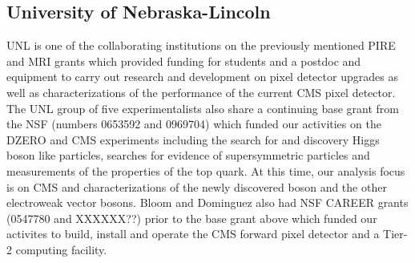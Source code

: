 \subsection{University of Nebraska-Lincoln} 

UNL is one of the collaborating institutions on the previously
mentioned PIRE and MRI grants which provided funding for students and
a postdoc and equipment to carry out research and development on pixel
detector upgrades as well as characterizations of the performance of
the current CMS pixel detector.  The UNL group of five
experimentalists also share a continuing base grant from the NSF
(numbers 0653592 and 0969704) which funded our activities on the DZERO
and CMS experiments including the search for and discovery Higgs boson
like particles, searches for evidence of supersymmetric particles and
measurements of the properties of the top quark.  At this time, our
analysis focus is on CMS and characterizations of the newly discovered
boson and the other electroweak vector bosons.  Bloom and Dominguez
also had NSF CAREER grants (0547780 and XXXXXX??) prior to the base
grant above which funded our activites to build, install and operate
the CMS forward pixel detector and a Tier-2 computing facility.
